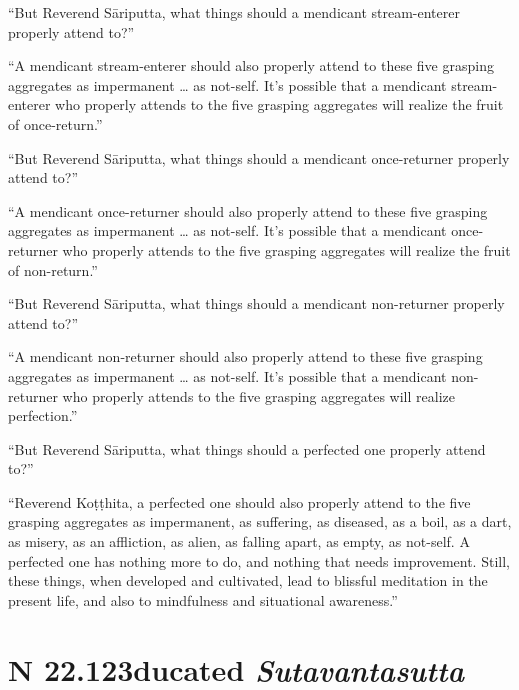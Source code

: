 \documentclass[12pt,openany]{book}%
\newcommand*{\suttatitleacronym}[1]{\smaller[2]{#1}\vspace*{.3em}}
\newcommand*{\suttatitletranslation}[1]{\linebreak{#1}}
\newcommand*{\suttatitleroot}[1]{\linebreak\smaller[2]\itshape{#1}}
\newcommand*{\tocacronym}[1]{\hspace*{-3.3em}{#1}\quad}
\newcommand*{\toctranslation}[1]{#1}
\newcommand*{\tocroot}[1]{(\textit{#1})}
\begin{document}
“But Reverend \textsanskrit{Sāriputta}, what things should a mendicant stream-enterer properly attend to?” 

“A mendicant stream-enterer should also properly attend to these five grasping aggregates as impermanent … as not-self. It’s possible that a mendicant stream-enterer who properly attends to the five grasping aggregates will realize the fruit of once-return.” 

“But Reverend \textsanskrit{Sāriputta}, what things should a mendicant once-returner properly attend to?” 

“A mendicant once-returner should also properly attend to these five grasping aggregates as impermanent … as not-self. It’s possible that a mendicant once-returner who properly attends to the five grasping aggregates will realize the fruit of non-return.” 

“But Reverend \textsanskrit{Sāriputta}, what things should a mendicant non-returner properly attend to?” 

“A mendicant non-returner should also properly attend to these five grasping aggregates as impermanent … as not-self. It’s possible that a mendicant non-returner who properly attends to the five grasping aggregates will realize perfection.” 

“But Reverend \textsanskrit{Sāriputta}, what things should a perfected one properly attend to?” 

“Reverend \textsanskrit{Koṭṭhita}, a perfected one should also properly attend to the five grasping aggregates as impermanent, as suffering, as diseased, as a boil, as a dart, as misery, as an affliction, as alien, as falling apart, as empty, as not-self. A perfected one has nothing more to do, and nothing that needs improvement. Still, these things, when developed and cultivated, lead to blissful meditation in the present life, and also to mindfulness and situational awareness.” 

%
\section*{{\suttatitleacronym SN 22.123}{\suttatitletranslation Educated }{\suttatitleroot Sutavantasutta}}
\addcontentsline{toc}{section}{\tocacronym{SN 22.123} \toctranslation{Educated } \tocroot{Sutavantasutta}}
\end{document}
